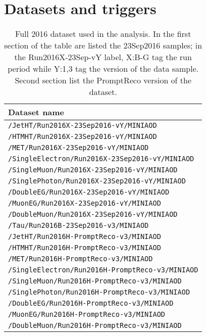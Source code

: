 \chapter{Datasets and triggers}

\begin{table}[ht!]
  \centering 
  \begin{tabular}{l}\hline
    Dataset name  \\ \hline
    \verb|/JetHT/Run2016X-23Sep2016-vY/MINIAOD|\\          
    \verb|/HTMHT/Run2016X-23Sep2016-vY/MINIAOD|\\         
    \verb|/MET/Run2016X-23Sep2016-vY/MINIAOD|\\            
    \verb|/SingleElectron/Run2016X-23Sep2016-vY/MINIAOD|\\ 
    \verb|/SingleMuon/Run2016X-23Sep2016-vY/MINIAOD|\\   
    \verb|/SinglePhoton/Run2016X-23Sep2016-vY/MINIAOD|\\   
    \verb|/DoubleEG/Run2016X-23Sep2016-vY/MINIAOD|\\     
    \verb|/MuonEG/Run2016X-23Sep2016-vY/MINIAOD|\\     
    \verb|/DoubleMuon/Run2016X-23Sep2016-vY/MINIAOD|\\
    \verb|/Tau/Run2016B-23Sep2016-v3/MINIAOD|\\\hline
    \verb|/JetHT/Run2016H-PromptReco-v3/MINIAOD|\\        
    \verb|/HTMHT/Run2016H-PromptReco-v3/MINIAOD|\\        
    \verb|/MET/Run2016H-PromptReco-v3/MINIAOD|\\          
    \verb|/SingleElectron/Run2016H-PromptReco-v3/MINIAOD|\\
    \verb|/SingleMuon/Run2016H-PromptReco-v3/MINIAOD|\\   
    \verb|/SinglePhoton/Run2016H-PromptReco-v3/MINIAOD|\\ 
    \verb|/DoubleEG/Run2016H-PromptReco-v3/MINIAOD|\\     
    \verb|/MuonEG/Run2016H-PromptReco-v3/MINIAOD|\\       
    \verb|/DoubleMuon/Run2016H-PromptReco-v3/MINIAOD|\\\hline 
  \end{tabular}
  \caption[Full 2016 dataset.]{Full 2016 dataset used in the analysis. In the first section of the table are listed the 23Sep2016 samples; in the Run2016X-23Sep-vY label, X:B-G tag the run period while Y:1,3 tag the version of the data sample. Second section list the PromptReco version of the dataset.}\label{tab:dataset}
\end{table}

